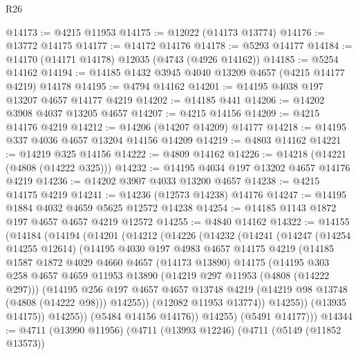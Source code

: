 \begin{lexlean}{R26}
\begin{coremodule}
@14173 := @4215 @11953
@14175 := @12022 (@14173 @13774)
@14176 := @13772 @14175
@14177 := @14172 @14176
@14178 := @5293 @14177
@14184 := @14170 (@14171 @14178) @12035 (@4743 (@4926 @14162))
@14185 := @5254 @14162
@14194 := @14185 @1432 @3945 @4040 @13209 @4657 (@4215 @14177 @4219) @14178
@14195 := @4794 @14162
@14201 := @14195 @4038 @197 @13207 @4657 @14177 @4219
@14202 := @14185 @441
@14206 := @14202 @3908 @4037 @13205 @4657
@14207 := @4215 @14156
@14209 := @4215 @14176 @4219
@14212 := @14206 (@14207 @14209) @14177
@14218 := @14195 @337 @4036 @4657 @13204 @14156 @14209
@14219 := @4803 @14162
@14221 := @14219 @325 @14156
@14222 := @4809 @14162
@14226 := @14218 (@14221 (@4808 (@14222 @325)))
@14232 := @14195 @4034 @197 @13202 @4657 @14176 @4219
@14236 := @14202 @3907 @4033 @13200 @4657
@14238 := @4215 @14175 @4219
@14241 := @14236 (@12573 @14238) @14176
@14247 := @14195 @1884 @4032 @4659 @5625 @12572 @14238
@14254 := @14185 @1143 @1872 @197 @4657 @4657 @4219 @12572
@14255 := @4840 @14162
@14322 := @14155
    (@14184
      (@14194
        (@14201
          (@14212
            (@14226
              (@14232
                (@14241
                  (@14247
                    (@14254 @14255 @12614)
                    (@14195
                      @4030
                      @197
                      @4983
                      @4657
                      @14175
                      @4219
                      (@14185
                        @1587
                        @1872
                        @4029
                        @4660
                        @4657
                        (@14173 @13890)
                        @14175
                        (@14195
                          @303
                          @258
                          @4657
                          @4659
                          @11953
                          @13890
                          (@14219 @297 @11953 (@4808 (@14222 @297)))
                          (@14195
                            @256
                            @197
                            @4657
                            @4657
                            @13748
                            @4219
                            (@14219 @98 @13748 (@4808 (@14222 @98)))
                            @14255))
                        (@12082 @11953 @13774))
                      @14255))
                  (@13935 @14175))
                @14255))
            (@5484 @14156 @14176))
          @14255)
        (@5491 @14177)))
@14344 := @4711
    (@13990 @11956)
    (@4711
      (@13993 @12246)
      (@4711
        (@5149 (@11852 @13573))

\end{coremodule}
\end{lexlean}

